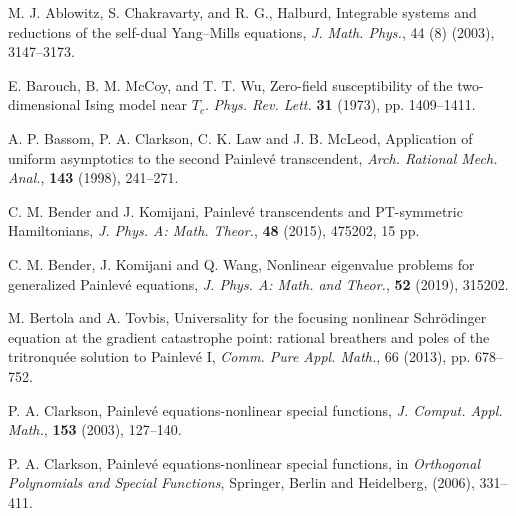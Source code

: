\documentclass[12pt]{article}
\theoremstyle{plain}
\theoremstyle{definition}
\numberwithin{equation}{section}
\begin{document}
\begin{thebibliography}{}
 
 \setlength{\baselineskip}{12pt}
{\small

M. J. Ablowitz, S. Chakravarty, and R. G., Halburd,
Integrable systems and reductions of the self-dual Yang–Mills equations,
\textit{J. Math. Phys.}, 44 (8) (2003), 3147--3173.










E. Barouch, B. M. McCoy, and T. T. Wu,
Zero-field susceptibility of the two-dimensional Ising model near $T_c$.
\textit{Phys. Rev. Lett.} \textbf{31} (1973), pp. 1409–1411.






A. P. Bassom, P. A. Clarkson, C. K. Law and J. B. McLeod,
Application of uniform asymptotics to the second Painlev\'{e} transcendent, {\it Arch. Rational Mech. Anal.}, \textbf{143} (1998), 241--271.

C. M. Bender and J. Komijani, Painlev\'{e} transcendents and PT-symmetric Hamiltonians, {\it J. Phys. A: Math. Theor.}, \textbf{48} (2015), 475202, 15 pp.

C. M. Bender, J. Komijani and Q. Wang,
Nonlinear eigenvalue problems for generalized Painlev\'{e} equations,
\textit{J. Phys. A: Math. and Theor.}, \textbf{52} (2019), 315202.


M. Bertola and A. Tovbis,
Universality for the focusing nonlinear Schr\"{o}dinger equation at the gradient catastrophe point:
rational breathers and poles of the tritronqu\'{e}e solution to Painlev\'{e} I,
\textit{Comm. Pure Appl. Math.}, {66} (2013), pp. 678--752.

P. A. Clarkson, Painlev\'{e} equations-nonlinear special functions, {\it J. Comput. Appl. Math.}, \textbf{153} (2003), 127--140.

P. A. Clarkson, Painlev\'{e} equations-nonlinear special functions, in {\it Orthogonal Polynomials and Special Functions}, Springer, Berlin and Heidelberg, (2006), 331--411.

}
\end{thebibliography}
\end{document}
